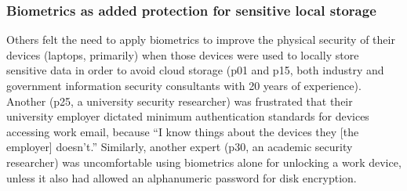
\subsubsection{Biometrics as added protection for sensitive local storage}
Others felt the need to apply biometrics to improve the physical security of
their devices (laptops, primarily) when those devices were used to locally store
sensitive data in order to avoid cloud storage (p01 and p15, both industry and
government information security consultants with 20 years of
experience). Another (p25, a university security researcher) was frustrated that
their university employer dictated minimum authentication standards for devices
accessing work email, because ``I know things about the devices they [the
employer] doesn't.'' Similarly, another expert (p30, an academic security
researcher) was uncomfortable using biometrics alone for unlocking a work
device, unless it also had allowed an alphanumeric password for disk encryption.

